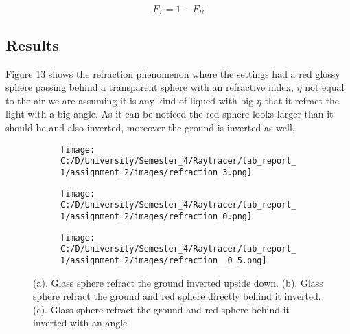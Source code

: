 \documentclass{article}
\begin{document}
\begin{equation}
F_T= 1 - F_R 
\end{equation}


\subsection{Results}
Figure 13 shows the refraction phenomenon where the settings had a red glossy sphere passing behind a transparent sphere with an refractive index, $\eta$ not equal to the air we are assuming it is any kind of liqued with big $\eta$ that it refract the light with a big angle. As it can be noticed the red sphere looks larger than it should be and also inverted, moreover the ground is inverted as well, 
\begin{figure}[H]
	\begin{subfigure}{.3\textwidth}
		\centering
		\texttt{[image: C:/D/University/Semester\_4/Raytracer/lab\_report\_1/assignment\_2/images/refraction\_3.png]}  
		\caption{}
		\label{fig:sub-first}
	\end{subfigure}
	\begin{subfigure}{.3\textwidth}
		\centering
		\texttt{[image: C:/D/University/Semester\_4/Raytracer/lab\_report\_1/assignment\_2/images/refraction\_0.png]}  
		\caption{}
		\label{fig:sub-second}
	\end{subfigure}
	\begin{subfigure}{.3\textwidth}
	\centering
	\texttt{[image: C:/D/University/Semester\_4/Raytracer/lab\_report\_1/assignment\_2/images/refraction\_\_0\_5.png]}  
	\caption{}
	\label{fig:sub-third}
\end{subfigure}

	\caption{(a). Glass sphere refract the ground inverted upside down. (b). Glass sphere refract the ground and red sphere directly behind it inverted. (c). Glass sphere refract the ground and red sphere behind it inverted with an angle}
	\label{fig:fig}
\end{figure}
\clearpage






\end{document}

